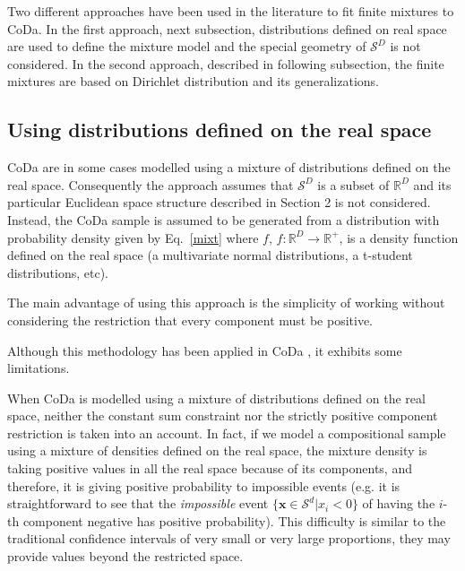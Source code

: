 \documentclass[preprint, review, 3p, authoryear]{elsarticle}
\begin{document}
\noindent Two different approaches have been used in the literature to fit finite mixtures to CoDa. 
In the first approach, next subsection, distributions defined on real space are used to define the mixture model and the special geometry of $\mathcal{S}^D$ is not considered. In the second approach, described in following subsection, the finite mixtures are based on Dirichlet distribution and its generalizations.


\subsection{Using distributions defined on the real space}
\label{real_section}

CoDa are in some cases modelled using a mixture of distributions defined on the real space. Consequently the approach assumes that $\mathcal{S}^D$ is a subset of $\mathbb{R}^D$ and its particular Euclidean space structure described in Section 2 is not considered. Instead, the CoDa sample is assumed to be generated from a distribution with probability density given by Eq.~\ref{mixt} where $f$, $f: \mathbb{R}^D \rightarrow \mathbb{R}^+$, is a density function defined on the real space (a multivariate normal distributions, a  t-student distributions, etc).

The main advantage of using this approach is the simplicity of working without considering the restriction that every component must be positive.

Although this methodology has been applied in CoDa \citep[see][]{papageorgiou2001model}, it exhibits some limitations.


When CoDa is modelled using a mixture of distributions defined on the real space, neither the constant sum constraint nor the strictly positive component restriction is taken into an account. In fact, if we model a compositional sample using a mixture of densities defined on the real space, the mixture density is taking positive values in all the real space because of its components, and therefore, it is giving positive probability to impossible events (e.g. it is straightforward to see that the \emph{impossible} event $\{ \textbf{x} \in \mathcal{S}^d | x_i < 0 \}$ of having the $i$-th component negative has positive probability). This difficulty is similar to the traditional confidence intervals of very small or very large proportions, they may provide values beyond the restricted space. 
\end{document}
